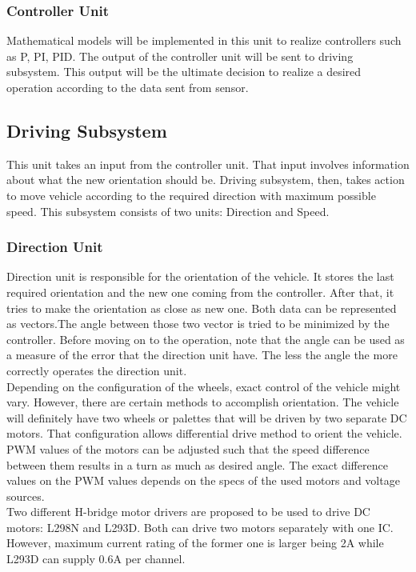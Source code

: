 \documentclass[a4paper,12pt]{article}
\begin{document}
\subsubsection{Controller Unit}
Mathematical models will be implemented in this unit to realize controllers such as P, PI, PID. The output of the controller unit will be sent to driving subsystem. This output will be the ultimate decision to realize a desired operation according to the data sent from sensor.

\subsection{Driving Subsystem}
This unit takes an input from the controller unit. That input involves information about what the new orientation should be. Driving subsystem, then, takes action to move vehicle according to the required direction with maximum possible speed. This subsystem consists of two units: Direction and Speed.
\subsubsection{Direction Unit}
Direction unit is responsible for the orientation of the vehicle. It stores the last required orientation and the new one coming from the controller. After that, it tries to make the orientation as close as new one. Both data can be represented as vectors.The angle between those two vector is tried to be minimized by the controller. Before moving on to the operation, note that the angle can be used as a measure of the error that the direction unit have. The less the angle the more correctly operates the direction unit.\\

Depending on the configuration of the wheels, exact control of the vehicle might vary. However, there are certain methods to accomplish orientation. The vehicle will definitely have two wheels or palettes that will be driven by two separate DC motors. That configuration allows differential drive method to orient the vehicle. PWM values of the motors can be adjusted such that the speed difference between them results in a turn as much as desired angle. The exact difference values on the PWM values depends on the specs of the used motors and voltage sources. \\

Two different H-bridge motor drivers are proposed to be used to drive DC motors: L298N and L293D. Both can drive two motors separately with one IC. However, maximum current rating of the former one is larger being 2A while L293D can supply 0.6A per channel. \\
\end{document}
